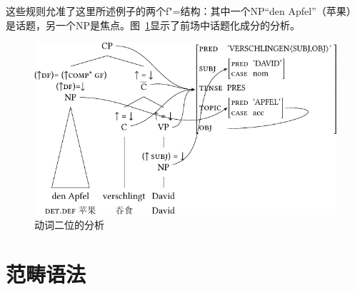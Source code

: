 \begin{enumerate}
\noindent
这些规则允准了这里所述例子的两个f"=结构：其中一个NP“den
  Apfel”（苹果）是话题，另一个NP是焦点。图~\ref{Abbildung-V2-LFG}显示了前场中话题化成分的分析。

\begin{figure}
\centerline{%
\includegraphics{Figures/den-apfel-verschlingt-david-lfg-lsp-crop}
}
\caption{\label{Abbildung-V2-LFG}动词二位的分析}
\end{figure}%
\end{enumerate}

\pagebreak
\section{范畴语法}

